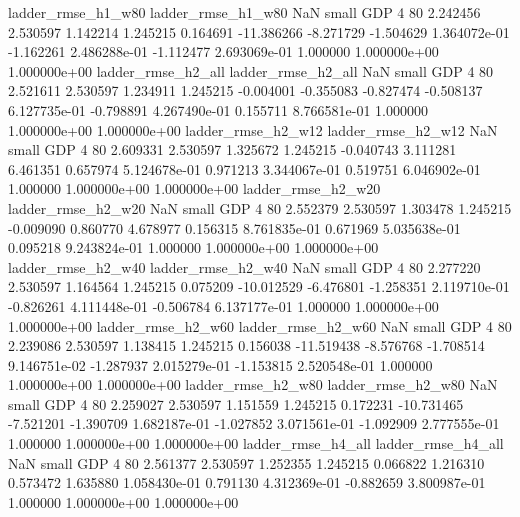       ladder_rmse_h1_w80       ladder_rmse_h1_w80                   NaN      small      GDP                 4 80 2.242456       2.530597 1.142214       1.245215    0.164691    -11.386266     -8.271729    -1.504629   1.364072e-01 -1.162261 2.486288e-01    -1.112477   2.693069e-01            1.000000    1.000000e+00        1.000000e+00
      ladder_rmse_h2_all       ladder_rmse_h2_all                   NaN      small      GDP                 4 80 2.521611       2.530597 1.234911       1.245215   -0.004001     -0.355083     -0.827474    -0.508137   6.127735e-01 -0.798891 4.267490e-01     0.155711   8.766581e-01            1.000000    1.000000e+00        1.000000e+00
      ladder_rmse_h2_w12       ladder_rmse_h2_w12                   NaN      small      GDP                 4 80 2.609331       2.530597 1.325672       1.245215   -0.040743      3.111281      6.461351     0.657974   5.124678e-01  0.971213 3.344067e-01     0.519751   6.046902e-01            1.000000    1.000000e+00        1.000000e+00
      ladder_rmse_h2_w20       ladder_rmse_h2_w20                   NaN      small      GDP                 4 80 2.552379       2.530597 1.303478       1.245215   -0.009090      0.860770      4.678977     0.156315   8.761835e-01  0.671969 5.035638e-01     0.095218   9.243824e-01            1.000000    1.000000e+00        1.000000e+00
      ladder_rmse_h2_w40       ladder_rmse_h2_w40                   NaN      small      GDP                 4 80 2.277220       2.530597 1.164564       1.245215    0.075209    -10.012529     -6.476801    -1.258351   2.119710e-01 -0.826261 4.111448e-01    -0.506784   6.137177e-01            1.000000    1.000000e+00        1.000000e+00
      ladder_rmse_h2_w60       ladder_rmse_h2_w60                   NaN      small      GDP                 4 80 2.239086       2.530597 1.138415       1.245215    0.156038    -11.519438     -8.576768    -1.708514   9.146751e-02 -1.287937 2.015279e-01    -1.153815   2.520548e-01            1.000000    1.000000e+00        1.000000e+00
      ladder_rmse_h2_w80       ladder_rmse_h2_w80                   NaN      small      GDP                 4 80 2.259027       2.530597 1.151559       1.245215    0.172231    -10.731465     -7.521201    -1.390709   1.682187e-01 -1.027852 3.071561e-01    -1.092909   2.777555e-01            1.000000    1.000000e+00        1.000000e+00
      ladder_rmse_h4_all       ladder_rmse_h4_all                   NaN      small      GDP                 4 80 2.561377       2.530597 1.252355       1.245215    0.066822      1.216310      0.573472     1.635880   1.058430e-01  0.791130 4.312369e-01    -0.882659   3.800987e-01            1.000000    1.000000e+00        1.000000e+00
